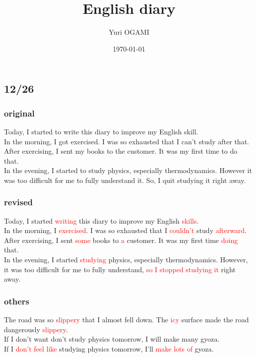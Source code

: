 \documentclass[a4paper,11pt]{jsarticle}
\numberwithin{equation}{section}
\begin{document}
\title{English diary}
\author{Yuri OGAMI}
\date{\today}
\maketitle

\subsection*{12/26}
\subsubsection*{original}
Today, I started to write this diary to improve my English skill.\\
In the morning, I got exercised. I was so exhausted that I can't study after that.\\
After exercising, I sent my books to the customer. It was my first time to do that.\\
In the evening, I started to study physics, especially thermodynamics. However it was too difficult for me to fully understand it.
So, I quit studying it right away.

\subsubsection*{revised}
Today, I started \textcolor{red}{writing} this diary to improve my English \textcolor{red}{skills}.\\
In the morning, I \textcolor{red}{exercised}. I was so exhausted that I \textcolor{red}{couldn’t} study \textcolor{red}{afterward}.\\
After exercising, I sent \textcolor{red}{some} books to \textcolor{red}{a} customer. It was my first time \textcolor{red}{doing} that.\\
In the evening, I started \textcolor{red}{studying} physics, especially thermodynamics. However, it was too difficult for me to fully understand, \textcolor{red}{so I stopped studying it} right away.

\subsubsection*{others}
The road was so \textcolor{red}{slippery} that I almost fell down. The \textcolor{red}{icy} surface made the road dangerously \textcolor{red}{slippery}.\\
If I don't want don't study physics tomorrow, I will make many gyoza.\\
If I \textcolor{red}{don't feel like} studying physics tomorrow, I'll \textcolor{red}{make lots of} gyoza.
\end{document}
